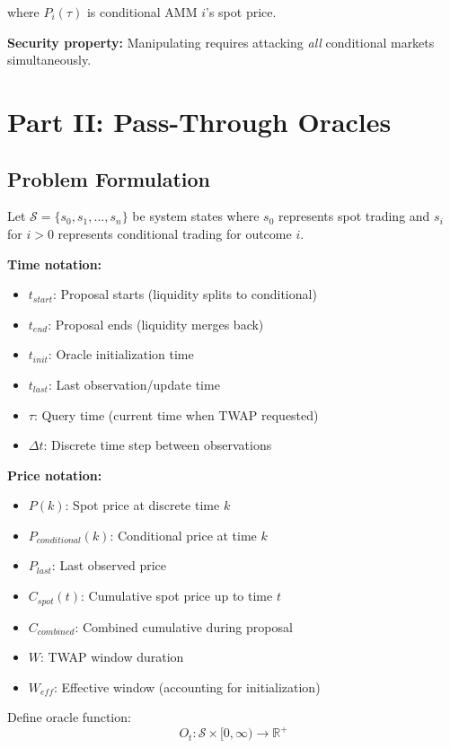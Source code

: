 \documentclass{article}
\begin{document}
where $P_i(\tau)$ is conditional AMM $i$'s spot price.

\textbf{Security property:} Manipulating requires attacking \emph{all} conditional markets simultaneously.

\section{Part II: Pass-Through Oracles}

\subsection{Problem Formulation}

Let $\mathcal{S} = \{s_0, s_1, ..., s_n\}$ be system states where $s_0$ represents spot trading and $s_i$ for $i > 0$ represents conditional trading for outcome $i$.

\textbf{Time notation:}
\begin{itemize}
\item $t_{start}$: Proposal starts (liquidity splits to conditional)
\item $t_{end}$: Proposal ends (liquidity merges back)
\item $t_{init}$: Oracle initialization time
\item $t_{last}$: Last observation/update time
\item $\tau$: Query time (current time when TWAP requested)
\item $\Delta t$: Discrete time step between observations
\end{itemize}

\textbf{Price notation:}
\begin{itemize}
\item $P(k)$: Spot price at discrete time $k$
\item $P_{conditional}(k)$: Conditional price at time $k$
\item $P_{last}$: Last observed price
\item $C_{spot}(t)$: Cumulative spot price up to time $t$
\item $C_{combined}$: Combined cumulative during proposal
\item $W$: TWAP window duration
\item $W_{eff}$: Effective window (accounting for initialization)
\end{itemize}

Define oracle function:
$$O_t: \mathcal{S} \times [0, \infty) \to \mathbb{R}^+$$
\end{document}
